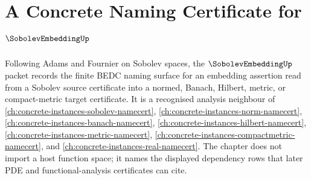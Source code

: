 \chapter{A Concrete Naming Certificate for $\SobolevEmbeddingUp$}
\label{ch:concrete-instances-sobolev-embedding-namecert}

Following Adams and Fournier on Sobolev spaces, the $\SobolevEmbeddingUp$ packet records the finite BEDC naming surface for an embedding assertion read from a Sobolev source certificate into a normed, Banach, Hilbert, metric, or compact-metric target certificate. It is a recognised analysis neighbour of \autoref{ch:concrete-instances-sobolev-namecert}, \autoref{ch:concrete-instances-norm-namecert}, \autoref{ch:concrete-instances-banach-namecert}, \autoref{ch:concrete-instances-hilbert-namecert}, \autoref{ch:concrete-instances-metric-namecert}, \autoref{ch:concrete-instances-compactmetric-namecert}, and \autoref{ch:concrete-instances-real-namecert}. The chapter does not import a host function space; it names the displayed dependency rows that later PDE and functional-analysis certificates can cite.

